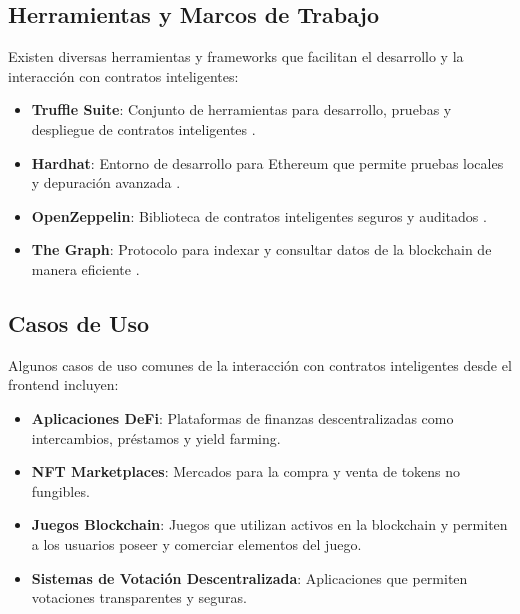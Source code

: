\subsection{Herramientas y Marcos de Trabajo}

Existen diversas herramientas y frameworks que facilitan el desarrollo y la interacción con contratos inteligentes:

\begin{itemize}
    \item \textbf{Truffle Suite}: Conjunto de herramientas para desarrollo, pruebas y despliegue de contratos inteligentes \cite{truffle}.

    \item \textbf{Hardhat}: Entorno de desarrollo para Ethereum que permite pruebas locales y depuración avanzada \cite{hardhat}.

    \item \textbf{OpenZeppelin}: Biblioteca de contratos inteligentes seguros y auditados \cite{openzeppelin}.

    \item \textbf{The Graph}: Protocolo para indexar y consultar datos de la blockchain de manera eficiente \cite{thegraph}.

\end{itemize}

\subsection{Casos de Uso}

Algunos casos de uso comunes de la interacción con contratos inteligentes desde el frontend incluyen:

\begin{itemize}
    \item \textbf{Aplicaciones DeFi}: Plataformas de finanzas descentralizadas como intercambios, préstamos y yield farming.

    \item \textbf{NFT Marketplaces}: Mercados para la compra y venta de tokens no fungibles.

    \item \textbf{Juegos Blockchain}: Juegos que utilizan activos en la blockchain y permiten a los usuarios poseer y comerciar elementos del juego.

    \item \textbf{Sistemas de Votación Descentralizada}: Aplicaciones que permiten votaciones transparentes y seguras.

\end{itemize}

